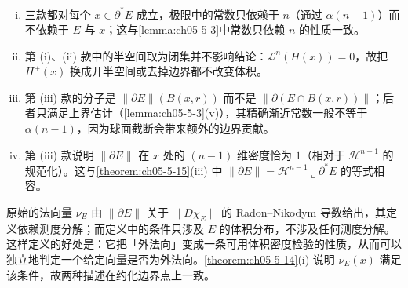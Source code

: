 \documentclass[../../main.tex]{subfiles}%
\begin{document}
\begin{remark}\label{remark:ch05-def-5-6-条件}
\begin{enumerate}[(i)]
\item 三款都对每个 $x\in\partial^*E$ 成立，极限中的常数只依赖于 $n$（通过 $\alpha(n-1)$）而不依赖于 $E$ 与 $x$；这与\cref{lemma:ch05-5-3}中常数只依赖 $n$ 的性质一致。%
\item 第 (i)、(ii) 款中的半空间取为闭集并不影响结论：$\mathcal{L}^n(H(x))=0$，故把 $H^+(x)$ 换成开半空间或去掉边界都不改变体积。
\item 第 (iii) 款的分子是 $\lVert\partial E\rVert(B(x,r))$ 而不是 $\lVert\partial(E\cap B(x,r))\rVert$；后者只满足上界估计（\cref{lemma:ch05-5-3}(v)），其精确渐近常数一般不等于 $\alpha(n-1)$，因为球面截断会带来额外的边界贡献。%
\item 第 (iii) 款说明 $\lVert\partial E\rVert$ 在 $x$ 处的 $(n-1)$ 维密度恰为 $1$（相对于 $\mathcal{H}^{n-1}$ 的规范化）。这与\cref{theorem:ch05-5-15}(iii) 中 $\lVert\partial E\rVert=\mathcal{H}^{n-1}\llcorner\partial^*E$ 的等式相容。%
\end{enumerate}
\end{remark}

\begin{remark}\label{remark:ch05-def-5-6-b}
原始的法向量 $\nu_E$ 由 $\lVert\partial E\rVert$ 关于 $\lVert D\chi_E\rVert$ 的 Radon--Nikodym 导数给出，其定义依赖测度分解；而定义中的条件只涉及 $E$ 的体积分布，不涉及任何测度分解。这样定义的好处是：它把「外法向」变成一条可用体积密度检验的性质，从而可以独立地判定一个给定向量是否为外法向。\cref{theorem:ch05-5-14}(i) 说明 $\nu_E(x)$ 满足该条件，故两种描述在约化边界点上一致。%
\end{remark}
\end{document}
